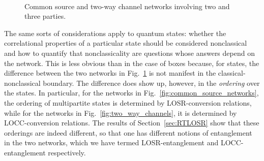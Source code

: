 \documentclass[prx,11pt,letterpaper,twocolumn,accepted=2023-11-27]{quantumarticle}
\theoremstyle{plain}
\theoremstyle{definition}
\begin{document}
\begin{figure}[htb]
\centering
    \\
    \caption{Common source and two-way channel networks involving two and three parties.
     }
     \label{fig:common_source_and_two_way}
\end{figure}


The same sorts of considerations apply to quantum states: whether the correlational properties of a particular state should be considered nonclassical and how to quantify that nonclassicality are questions whose answers depend
 on the network.  This is less obvious than in the case of boxes because, for states, the difference between the two networks in Fig.~\ref{fig:common_source_and_two_way}
 is not manifest in the classical-nonclassical boundary.  The difference does show up, however, in the {\em ordering} over the states.
 In particular, for the networks in Fig.~\ref{fig:common_source_networks}, the ordering of multipartite states is determined by LOSR-conversion relations, while for the networks in Fig.~\ref{fig:two_way_channels}, it is determined by LOCC-conversion relations. 
 The results of Section~\ref{sec:RTLOSR} show that these orderings are indeed different, so that one has different notions of entanglement  in the two networks, which we have termed LOSR-entanglement and LOCC-entanglement respectively. 
\end{document}

